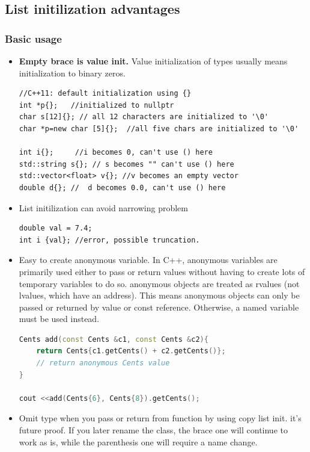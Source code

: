 \documentclass[a4paper,11pt,twoside]{book}
\begin{document}
\subsection{List initilization advantages}
			 

\subsubsection{Basic usage}
\begin{itemize}
	
	 \item \textbf{Empty brace is value init.} Value initialization of types usually means initialization to binary zeros.
\begin{lstlisting}[numbers = none]
//C++11: default initialization using {}
int *p{};   //initialized to nullptr
char s[12]{}; // all 12 characters are initialized to '\0'
char *p=new char [5]{};  //all five chars are initialized to '\0'
		
int i{};     //i becomes 0, can't use () here         
std::string s{}; // s becomes "" can't use () here  
std::vector<float> v{}; //v becomes an empty vector
double d{}; //  d becomes 0.0, can't use () here        
\end{lstlisting}

    \item List initilization can avoid narrowing problem
\begin{lstlisting}[numbers=none]
double val = 7.4;
int i {val}; //error, possible truncation.
\end{lstlisting}

    \item Easy to create anonymous variable. In C++, anonymous variables are primarily used either to pass or return values without having to create lots of temporary variables to do so. anonymous objects are treated as rvalues (not lvalues, which have an address). This means anonymous objects can only be passed or returned by value or const reference. Otherwise, a named variable must be used instead.

\begin{lstlisting}[frame=single, language=c++]
Cents add(const Cents &c1, const Cents &c2){
	return Cents{c1.getCents() + c2.getCents()};
	// return anonymous Cents value
}

cout <<add(Cents{6}, Cents{8}).getCents();
\end{lstlisting}

    \item Omit type when you pass or return from function by using copy list init. it's future proof. If you later rename the class, the brace one will continue to work as is, while the parenthesis one will require a name change.


\end{itemize}
\end{document}
